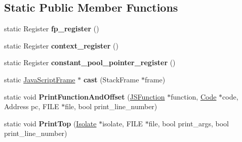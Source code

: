 \subsection*{Static Public Member Functions}
\begin{DoxyCompactItemize}
\item 
\hypertarget{classv8_1_1internal_1_1_java_script_frame_aeac2817ca9aa85228525437bb63ba93a}{}static Register {\bfseries fp\+\_\+register} ()\label{classv8_1_1internal_1_1_java_script_frame_aeac2817ca9aa85228525437bb63ba93a}

\item 
\hypertarget{classv8_1_1internal_1_1_java_script_frame_a9e00a6dd7a2c9facca672c58dbc71df6}{}static Register {\bfseries context\+\_\+register} ()\label{classv8_1_1internal_1_1_java_script_frame_a9e00a6dd7a2c9facca672c58dbc71df6}

\item 
\hypertarget{classv8_1_1internal_1_1_java_script_frame_af5bce3abfebd253e22d34c5f2e6a14ff}{}static Register {\bfseries constant\+\_\+pool\+\_\+pointer\+\_\+register} ()\label{classv8_1_1internal_1_1_java_script_frame_af5bce3abfebd253e22d34c5f2e6a14ff}

\item 
\hypertarget{classv8_1_1internal_1_1_java_script_frame_ac66e5118c1b57fd1508b201694cd7d54}{}static \hyperlink{classv8_1_1internal_1_1_java_script_frame}{Java\+Script\+Frame} $\ast$ {\bfseries cast} (Stack\+Frame $\ast$frame)\label{classv8_1_1internal_1_1_java_script_frame_ac66e5118c1b57fd1508b201694cd7d54}

\item 
\hypertarget{classv8_1_1internal_1_1_java_script_frame_ad44849ad3b95b89853394db76c32734d}{}static void {\bfseries Print\+Function\+And\+Offset} (\hyperlink{classv8_1_1internal_1_1_j_s_function}{J\+S\+Function} $\ast$function, \hyperlink{classv8_1_1internal_1_1_code}{Code} $\ast$code, Address pc, F\+I\+L\+E $\ast$file, bool print\+\_\+line\+\_\+number)\label{classv8_1_1internal_1_1_java_script_frame_ad44849ad3b95b89853394db76c32734d}

\item 
\hypertarget{classv8_1_1internal_1_1_java_script_frame_a69de8494527b217bfd2bcde82196cd31}{}static void {\bfseries Print\+Top} (\hyperlink{classv8_1_1internal_1_1_isolate}{Isolate} $\ast$isolate, F\+I\+L\+E $\ast$file, bool print\+\_\+args, bool print\+\_\+line\+\_\+number)\label{classv8_1_1internal_1_1_java_script_frame_a69de8494527b217bfd2bcde82196cd31}

\end{DoxyCompactItemize}
